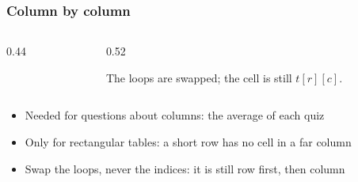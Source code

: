 \documentclass[aspectratio=169,10pt,compress]{beamer}
\begin{document}
\begin{frame}[t,fragile] \frametitle{Column by column}
	\begin{columns}[T]
		\begin{column}{0.44\textwidth}


\begin{algorithm}[H]
				\caption{ColumnByColumn($t$), rectangular}
\end{algorithm}

		\end{column}
		\begin{column}{0.52\textwidth}
			\begin{center}
			\end{center}
			\small The loops are swapped; the cell is still $t[r][c]$.
		\end{column}
	\end{columns}

	\vspace{0.5em}
	\begin{itemize}\small
		\item Needed for questions about columns: the average of each quiz
		\item Only for rectangular tables: a short row has no cell in a far column
		\item Swap the loops, never the indices: it is still row first, then column
	\end{itemize}
\end{frame}
\end{document}
